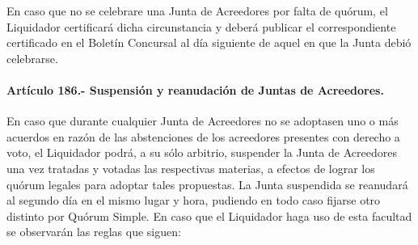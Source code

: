 \documentclass[
]{book}
\begin{document}
En caso que no se celebrare una Junta de Acreedores por falta de quórum, el Liquidador certificará dicha circunstancia y deberá publicar el correspondiente certificado en el Boletín Concursal al día siguiente de aquel en que la Junta debió celebrarse.

\hypertarget{artuxedculo-186.--suspensiuxf3n-y-reanudaciuxf3n-de-juntas-de-acreedores.}{%
\paragraph*{Artículo 186.- Suspensión y reanudación de Juntas de Acreedores.}\label{artuxedculo-186.--suspensiuxf3n-y-reanudaciuxf3n-de-juntas-de-acreedores.}}

En caso que durante cualquier Junta de Acreedores no se adoptasen uno o más acuerdos en razón de las abstenciones de los acreedores presentes con derecho a voto, el Liquidador podrá, a su sólo arbitrio, suspender la Junta de Acreedores una vez tratadas y votadas las respectivas materias, a efectos de lograr los quórum legales para adoptar tales propuestas.
La Junta suspendida se reanudará al segundo día en el mismo lugar y hora, pudiendo en todo caso fijarse otro distinto por Quórum Simple. En caso que el Liquidador haga uso de esta facultad se observarán las reglas que siguen:
\end{document}
